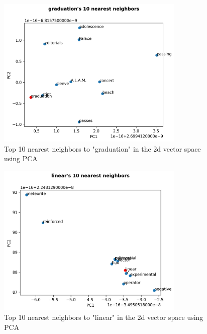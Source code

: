 \documentclass[12pt,letterpaper]{article}
\begin{document}
\begin{figure}[H]
\begin{center}
  \includegraphics[width=0.8\textwidth]{../graphs/graduation_neighbors.png}
\end{center}
\caption{Top 10 nearest neighbors to "graduation" in the 2d vector space using PCA}
\end{figure}


\begin{figure}[H]
\begin{center}
  \includegraphics[width=0.8\textwidth]{../graphs/linear_neighbors.png}
\end{center}
\caption{Top 10 nearest neighbors to "linear" in the 2d vector space using PCA}
\end{figure}
\end{document}

